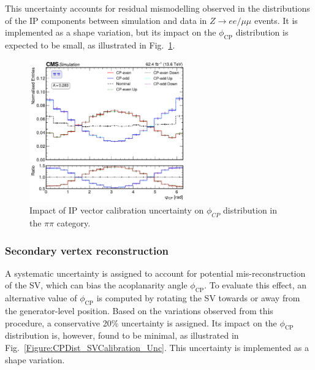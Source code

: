 This uncertainty accounts for residual mismodelling observed in the distributions of the \ac{IP} components between simulation and data in $Z \to ee/\mu\mu$ events. It is implemented as a shape variation, but its impact on the $\phi_{\text{CP}}$ distribution is expected to be small, as illustrated in Fig.~\ref{Figure:CPDist_IPCalibration_Unc}.

\begin{figure}[!htbp]
    \centering
    \includegraphics[width=0.6\textwidth]{Figures/Chapter7/Acoplanarity/Angular_Systematics/aco_pi_pi.pdf}
    \caption{Impact of IP vector calibration uncertainty on $\phi_{CP}$ distribution in the $\pi\pi$ category.}
    \label{Figure:CPDist_IPCalibration_Unc}
\end{figure}

\subsubsection{Secondary vertex reconstruction}

A systematic uncertainty is assigned to account for potential mis-reconstruction of the \ac{SV}, which can bias the acoplanarity angle $\phi_{\text{CP}}$.  
To evaluate this effect, an alternative value of $\phi_{\text{CP}}$ is computed by rotating the \ac{SV} towards or away from the generator-level position.  
Based on the variations observed from this procedure, a conservative 20\% uncertainty is assigned.  Its impact on the $\phi_{\text{CP}}$ distribution is, however, found to be minimal, as illustrated in Fig.~\ref{Figure:CPDist_SVCalibration_Unc}.  
This uncertainty is implemented as a shape variation.

